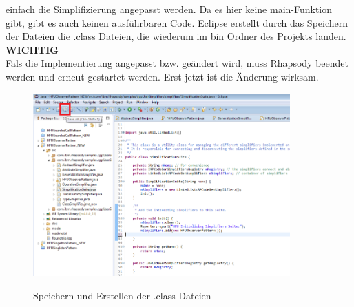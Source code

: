 einfach die Simplifizierung angepasst werden. Da es hier keine main-Funktion
gibt, gibt es auch keinen ausführbaren Code. Eclipse erstellt durch das
Speichern der Dateien die .class Dateien, die wiederum im bin Ordner des
Projekts landen.\\ 
\textbf{WICHTIG}\\
Fals die Implementierung angepasst bzw. geändert wird, muss
Rhapsody beendet werden und erneut gestartet werden. Erst jetzt ist die Änderung
wirksam.  
\begin{figure}[H]
	\centering
	\includegraphics[width=0.88\textwidth]{content/pictures/install/saveBin.png}
	\label{pic:bild}
	\caption{Speichern und Erstellen der .class Dateien}
\end{figure}




